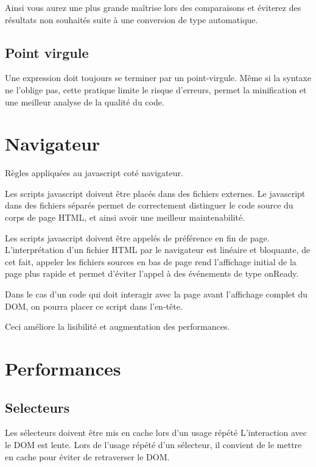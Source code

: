 			Ainsi vous aurez une plus grande maîtrise lors des comparaisons et éviterez des résultats non souhaités suite à une conversion de type automatique.

		\subsection{Point virgule}
			Une expression doit toujours se terminer par un point-virgule. Même si la syntaxe ne l'oblige pas, cette pratique limite le risque d'erreurs, permet la minification et une meilleur analyse de la qualité du code.

	\section{Navigateur}
		Règles appliquées au javascript coté navigateur.

		Les scripts javascript doivent être placés dans des fichiers externes. Le javascript dans des fichiers séparés permet de correctement distinguer le code source du corps de page HTML, et ainsi avoir une meilleur maintenabilité.

		Les scripts javascript doivent être appelés de préférence en fin de page. L'interprétation d'un fichier HTML par le navigateur est linéaire et bloquante, de cet fait, appeler les fichiers sources en bas de page rend l’affichage initial de la page plus rapide et permet d'éviter l'appel à des événements de type onReady.

		Dans le cas d'un code qui doit interagir avec la page avant l’affichage complet du DOM, on pourra placer ce script dans l'en-tête.

		Ceci améliore la lisibilité et augmentation des performances.

	\section{Performances}
		\subsection{Selecteurs}
			Les sélecteurs doivent être mis en cache lors d'un usage répété L'interaction avec le DOM est lente. Lors de l'usage répété d'un sélecteur, il convient de le mettre en cache pour éviter de retraverser le DOM. 

